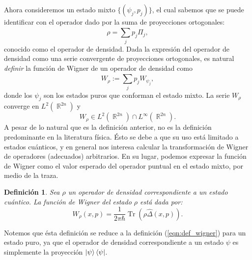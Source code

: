 \documentclass[a4paper]{report}
\DeclareMathOperator{\R}{\mathbb{R}}
\DeclareMathOperator{\Tr}{Tr}
\newtheorem{definition}{Definición}
\begin{document}
  Ahora consideremos un estado mixto $\{(\psi_j,p_j)\}$, el
  cual sabemos que se puede identificar con el operador dado
  por la suma de proyecciones ortogonales:
  \begin{equation}
    \rho = \sum_{j}^{} p_j \Pi_j,
  \end{equation} 
  conocido como el operador de densidad. Dada la expresión
  del operador de densidad como una serie convergente de
  proyecciones ortogonales, es natural \textit{definir} la
  función de Wigner de un operador de densidad como
  \begin{equation}
    W_\rho 
    := \sum_{j}^{} p_j W_{\psi_j},
  \end{equation} 
  donde los $\psi_j$ son los estados puros que conforman el
  estado mixto. La serie $W_\rho$ converge en $L^2(\R^{2n})$
  y 
  \begin{equation}
    W_\rho \in L^2(\R^{2n}) \cap L^{\infty}(\R^{2n}).
  \end{equation}
  A pesar de lo natural que es la definición anterior, no es
  la definición predominante en la literatura física. Ésto
  se debe a que su uso está limitado a estados cuánticos, y
  en general nos interesa calcular la transformación de
  Wigner de operadores (adecuados) arbitrarios. En su lugar,
  podemos expresar la función de Wigner como el valor
  esperado del operador puntual en el estado mixto, por
  medio de la traza.
  \begin{definition}
    Sea $\rho$ un operador de densidad correspondiente a un
    estado cuántico. La función de Wigner del estado $\rho$ 
    está dada por:
    \begin{equation}
      W_\rho(x,p)
      = \frac{1}{2\pi\hbar} \Tr\left( \rho \hat \Delta(x,p)
      \right).
    \end{equation}
  \end{definition}
  Notemos que ésta definición se reduce a la definición
  (\ref{eqn:def_wigner}) para un estado puro, ya que el
  operador de densidad correspondiente a un estado $\psi$ es
  simplemente la proyección $\ket \psi \bra \psi$.
\end{document}
